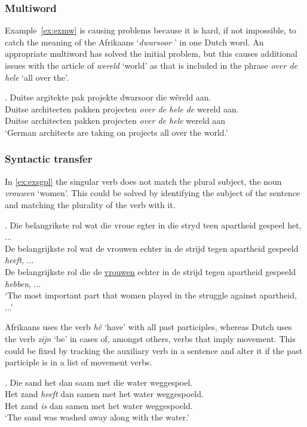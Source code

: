 \documentclass[11pt]{article}
\begin{document}
\subsubsection{Multiword}

Example~\ref{ex:exmw} is causing problems because it is hard, if not impossible, to catch the meaning of the 
Afrikaans `{\em dwarsoor}  ' in one Dutch word. An appropriate multiword has solved the initial problem, but this 
causes additional issues with the article of {\em wereld} `world' as that is included in the 
phrase {\em over de hele} `all over the'.

\ex. \label{ex:exmw} 
    Duitse argitekte pak projekte dwarsoor die wêreld aan. \\
    Duitse architecten pakken projecten {\em over de hele de} wereld aan. \\
    Duitse architecten pakken projecten {\em over de hele} wereld aan \\
   `German architects are taking on projects all over the world.'

\subsubsection{Syntactic transfer}

In \ref{ex:exsgpl} the singular verb does not match the plural subject, the noun {\em vrouwen} `women'. This 
could be solved by identifying the subject of the sentence and matching the plurality 
of the verb with it.

\ex. \label{ex:exsgpl} 
    Die belangrikste rol wat die vroue egter in die stryd teen apartheid gespeel het, ... \\
    De belangrijkste rol wat de vrouwen echter in de strijd tegen apartheid gespeeld {\em heeft}, ... \\
    De belangrijkste rol die de \underline{vrouwen} echter in de strijd tegen apartheid gespeeld {\em hebben}, ... \\
    `The most important part that women played in the struggle against apartheid, ...' 

Afrikaans uses the verb {\em hê} `have' with all past participles, whereas Dutch uses the 
verb {\em zijn} `be' in cases of, amongst others, verbs that imply movement. This could be fixed 
by tracking the auxiliary verb in a sentence and alter it if the past participle is in a list
of movement verbs.

\ex. \label{ex:exserhaverl} 
    Die sand het dan saam met die water weggespoel. \\
    Het zand {\em heeft} dan samen met het water weggespoeld. \\
    Het zand {\em is} dan samen met het water weggespoeld. \\
   `The sand was washed away along with the water.'
\end{document}
